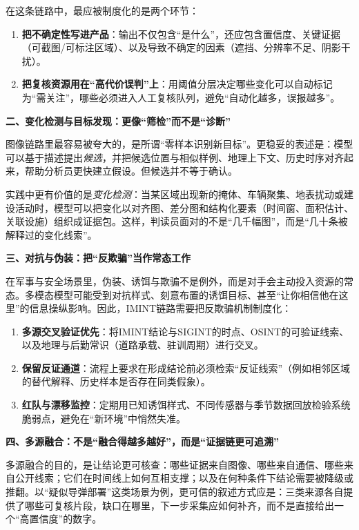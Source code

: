 在这条链路中，最应被制度化的是两个环节：
\begin{enumerate}[label=(\arabic*)]
    \item \textbf{把不确定性写进产品}：输出不仅包含“是什么”，还应包含置信度、关键证据（可截图/可标注区域）、以及导致不确定的因素（遮挡、分辨率不足、阴影干扰）。
    \item \textbf{把复核资源用在“高代价误判”上}：用阈值分层决定哪些变化可以自动标记为“需关注”，哪些必须进入人工复核队列，避免“自动化越多，误报越多”。
\end{enumerate}

	{\bfseries 二、变化检测与目标发现：更像“筛检”而不是“诊断”}

图像链路里最容易被夸大的，是所谓“零样本识别新目标”。更稳妥的表述是：模型可以基于描述提出\emph{候选}，并把候选位置与相似样例、地理上下文、历史时序对齐起来，帮助分析员更快建立假设。但候选并不等于确认。

实践中更有价值的是\emph{变化检测}：当某区域出现新的掩体、车辆聚集、地表扰动或建设活动时，模型可以把变化以对齐图、差分图和结构化要素（时间窗、面积估计、关联设施）组织成证据包。这样，判读员面对的不是“几千幅图”，而是“几十条被解释过的变化线索”。

    {\bfseries 三、对抗与伪装：把“反欺骗”当作常态工作}

在军事与安全场景里，伪装、诱饵与欺骗不是例外，而是对手会主动投入资源的常态。多模态模型可能受到对抗样式、刻意布置的诱饵目标、甚至“让你相信他在这里”的信息操纵影响。因此，IMINT链路需要把反欺骗机制制度化：
\begin{enumerate}[label=(\arabic*)]
    \item \textbf{多源交叉验证优先}：将IMINT结论与SIGINT的时点、OSINT的可验证线索、以及地理与后勤常识（道路承载、驻训周期）进行交叉。
    \item \textbf{保留反证通道}：流程上要求在形成结论前必须检索“反证线索”（例如相邻区域的替代解释、历史样本是否存在同类假象）。
    \item \textbf{红队与漂移监控}：定期用已知诱饵样式、不同传感器与季节数据回放检验系统脆弱点，避免在“新环境”中悄然失准。
\end{enumerate}

    {\bfseries 四、多源融合：不是“融合得越多越好”，而是“证据链更可追溯”}

多源融合的目的，是让结论更可核查：哪些证据来自图像、哪些来自通信、哪些来自公开线索；它们在时间线上如何互相支撑；以及在何种条件下结论需要被降级或推翻。以“疑似导弹部署”这类场景为例，更可信的叙述方式应是：三类来源各自提供了哪些可复核片段，缺口在哪里，下一步采集应如何补齐，而不是直接给出一个“高置信度”的数字。

